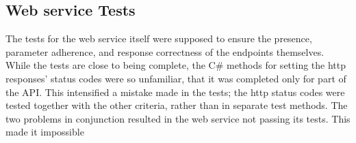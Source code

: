 \subsection{Web service Tests}
The tests for the web service itself were supposed to ensure the presence,
parameter adherence, and response correctness of the endpoints themselves.
While the tests are close to being complete, the C# methods for setting the http
responses' status codes were so unfamiliar, that it was completed only for part
of the API. This intensified a mistake made in the tests; the http status codes
were tested together with the other criteria, rather than in separate test
methods. The two problems in conjunction resulted in the web service not passing
its tests. This made it impossible 
